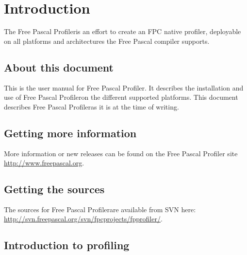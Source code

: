 \documentclass[twoside]{book}
\newcommand{\fpp}{Free Pascal Profiler}
\newcommand{\fpprofilerwebsite}{\url{http://www.freepascal.org}}
\begin{document}
\tableofcontents

\chapter{Introduction}
The \fpp is an effort to create an FPC native profiler, deployable on all platforms and
architectures the Free Pascal compiler supports.

\section{About this document}
This is the user manual for \fpp. It describes the
installation and use of \fpp on the different supported
platforms. This document describes \fpp as it is at the time
of writing.

\section{Getting more information}
More information or new releases can be found on the \fpp
site \fpprofilerwebsite.

\section{Getting the sources}
The sources for \fpp are available from SVN here: \url{http://svn.freepascal.org/svn/fpcprojects/fpprofiler/}.

\section{Introduction to profiling}


\listoftables
\listoffigures
\appendix                              %
\end{document}
